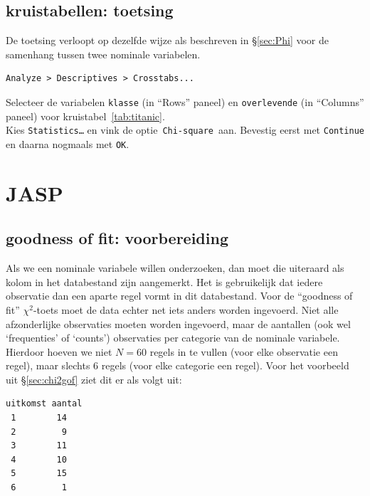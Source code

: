 \documentclass[
]{book}
\begin{document}
\hypertarget{kruistabellen-toetsing}{%
\subsection{kruistabellen: toetsing}\label{kruistabellen-toetsing}}

De toetsing verloopt op dezelfde wijze als beschreven in
§\ref{sec:Phi} voor
de samenhang tussen twee nominale variabelen.

\begin{verbatim}
Analyze > Descriptives > Crosstabs...
\end{verbatim}

Selecteer de variabelen \texttt{klasse} (in ``Rows'' paneel) en \texttt{overlevende} (in
``Columns'' paneel) voor
kruistabel~\ref{tab:titanic}.\\
Kies \texttt{Statistics\ldots{}} en vink de optie~\texttt{Chi-square}~aan. Bevestig eerst met
\texttt{Continue} en daarna nogmaals met \texttt{OK}.

\hypertarget{jasp-16}{%
\section{JASP}\label{jasp-16}}

\hypertarget{goodness-of-fit-voorbereiding-1}{%
\subsection{goodness of fit: voorbereiding}\label{goodness-of-fit-voorbereiding-1}}

Als we een nominale variabele willen onderzoeken, dan moet die uiteraard
als kolom in het databestand zijn aangemerkt. Het is gebruikelijk dat iedere observatie dan een aparte regel vormt in dit databestand. Voor de ``goodness of fit'' \(\chi^2\)-toets moet de data echter net iets anders worden ingevoerd. Niet alle afzonderlijke observaties moeten worden ingevoerd, maar de aantallen (ook wel `frequenties' of `counts') observaties per categorie van de nominale variabele. Hierdoor hoeven we niet \(N=60\) regels in te vullen (voor elke observatie een regel), maar slechts 6 regels (voor elke categorie een regel). Voor het voorbeeld uit §\ref{sec:chi2gof} ziet dit er als volgt uit:

\begin{verbatim}
uitkomst aantal
 1        14
 2         9
 3        11
 4        10
 5        15
 6         1
\end{verbatim}
\end{document}
